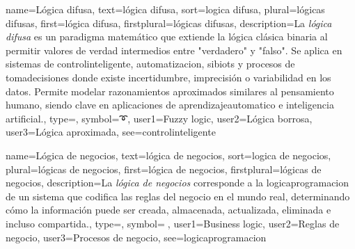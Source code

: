 	
	{
		name={L{\'o}gica difusa},
		text={l{\'o}gica difusa},
		sort={logica difusa},
		plural={l{\'o}gicas difusas},
		first={l{\'o}gica difusa},
		firstplural={l{\'o}gicas difusas},
		description={La \emph{l{\'o}gica difusa} es un paradigma matem{\'a}tico que extiende la l{\'o}gica cl{\'a}sica binaria al permitir valores de verdad intermedios entre "verdadero" y "falso". Se aplica en sistemas de \gls{controlinteligente}, \gls{automatizacion}, \glspl{sibiot} y procesos de \gls{tomadecisiones} donde existe incertidumbre, imprecisi{\'o}n o variabilidad en los \glspl{dato}. Permite modelar razonamientos aproximados similares al pensamiento humano, siendo clave en aplicaciones de \gls{aprendizajeautomatico} e inteligencia artificial.},
		type=\glsdefaulttype,
		symbol={➰},
		user1={Fuzzy logic},
		user2={L{\'o}gica borrosa},
		user3={L{\'o}gica aproximada},
		see={controlinteligente}
	}
	
	{
		name={L{\'o}gica de negocios},
		text={l{\'o}gica de negocios},
		sort={logica de negocios},
		plural={l{\'o}gicas de negocios},
		first={l{\'o}gica de negocios},
		firstplural={l{\'o}gicas de negocios},
		description={La \emph{l{\'o}gica de negocios} corresponde a la \gls{logicaprogramacion} de un sistema que codifica las reglas del negocio en el mundo real, determinando c{\'o}mo la informaci{\'o}n puede ser creada, almacenada, actualizada, eliminada e incluso compartida.},
		type=\glsdefaulttype,
		symbol={🏢},
		user1={Business logic},
		user2={Reglas de negocio},
		user3={Procesos de negocio},
		see={logicaprogramacion}
	}
	
